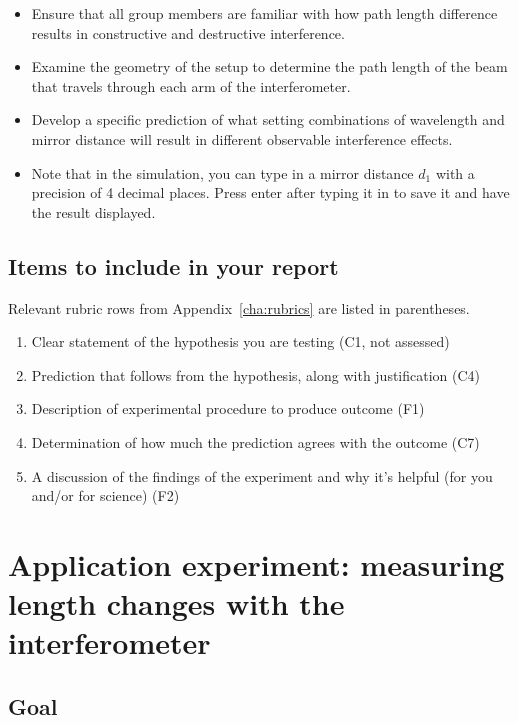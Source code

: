 \begin{itemize}
	\item Ensure that all group members are familiar with how path length difference results in constructive and destructive interference.
	
	\item Examine the geometry of the setup to determine the path length of the beam that travels through each arm of the interferometer.
	
	\item Develop a specific prediction of what setting combinations of wavelength and mirror distance will result in different observable interference effects.
	
	\item Note that in the simulation, you can type in a mirror distance $d_1$ with a precision of 4 decimal places. Press enter after typing it in to save it and have the result displayed.
\end{itemize}

\subsection{Items to include in your report}

Relevant rubric rows from Appendix~\ref{cha:rubrics} are listed in parentheses.

\begin{enumerate}
	\item Clear statement of the hypothesis you are testing (C1, not assessed)
	\item Prediction that follows from the hypothesis, along with justification (C4)
	\item Description of experimental procedure to produce outcome (F1)
	\item Determination of how much the prediction agrees with the outcome (C7)
	\item A discussion of the findings of the experiment and why it's helpful (for you and/or for science) (F2)
\end{enumerate}

\section{Application experiment: measuring length changes with the interferometer}

\subsection{Goal}

